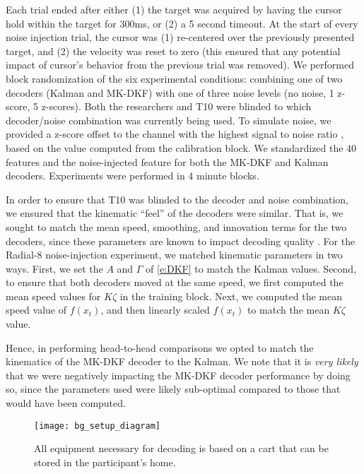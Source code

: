 Each trial ended after either (1) the target was acquired by having the cursor hold within the target for 300ms, or (2) a 5 second timeout. At the start of every noise injection trial, the cursor was (1) re-centered over the previously presented target, and (2) the velocity was reset to zero (this ensured that any potential impact of cursor's behavior from the previous trial was removed). We performed block randomization of the six experimental conditions: combining one of two decoders (Kalman and MK-DKF) with one of three noise levels (no noise, 1 z-score, 5 z-scores). Both the researchers and T10 were blinded to which decoder/noise combination was currently being used. To simulate noise, we provided a z-score offset to the channel with the highest signal to noise ratio \cite{Malik2015}, based on the value computed from the calibration block. We standardized the 40 features and the noise-injected feature for both the MK-DKF and Kalman decoders. Experiments were performed in 4 minute blocks. 

In order to ensure that T10 was blinded to the decoder and noise combination, we ensured that the kinematic ``feel'' of the decoders were similar. That is, we sought to match the mean speed, smoothing, and innovation terms for the two decoders, since these parameters are known to impact decoding quality \cite{Willett2017}. For the Radial-8 noise-injection experiment, we matched kinematic parameters in two ways. First, we set the $A$ and $\Gamma$ of \eqref{e:DKF} to match the Kalman values. Second, to ensure that both decoders moved at the same speed, we first computed the mean speed values for $K\zeta$ in the training block. Next, we computed the mean speed value of $f(x_t)$, and then linearly scaled $f(x_t)$ to match the mean $K\zeta$ value. 

Hence, in performing head-to-head comparisons we opted to match the kinematics of the MK-DKF decoder to the Kalman. We note that it is \emph{very likely} that we were negatively impacting the MK-DKF decoder performance by doing so, since the parameters used were likely sub-optimal compared to those that would have been computed. 

\begin{figure}[h]
\begin{minipage}[c]{.33\textwidth}
\texttt{[image: bg\_setup\_diagram]}
\end{minipage}
\hfill
\begin{minipage}[c]{.66\textwidth}
\caption[The BrainGate cart setup]{All equipment necessary for decoding is based on a cart that can be stored in the participant's home.}
\end{minipage}
\end{figure}

